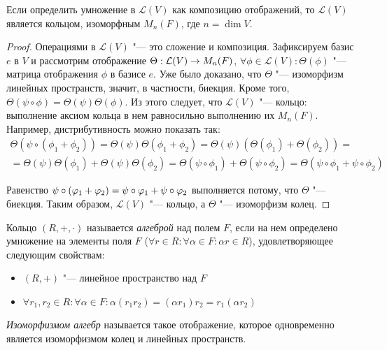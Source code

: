 \begin{corollary}
	Если определить умножение в $\mathcal{L}(V)$ как композицию отображений, то $\mathcal{L}(V)$ является кольцом, изоморфным $M_n(F)$, где $n = \dim{V}$.
\end{corollary}

\begin{proof}
	Операциями в $\mathcal{L}(V)$ "--- это сложение и композиция. Зафиксируем базис $e$ в $V$ и рассмотрим отображение $\Theta: \mathcal{L}(V) \hm{\rightarrow} M_n(F)$, $\forall \phi \in \mathcal{L}(V): \Theta(\phi)$ "--- матрица отображения $\phi$ в базисе $e$. Уже было доказано, что $\Theta$ "--- изоморфизм линейных пространств, значит, в частности, биекция. Кроме того, $\Theta(\psi \circ \phi) = \Theta(\psi)\Theta(\phi)$. Из этого следует, что $\mathcal{L}(V)$ "--- кольцо: выполнение аксиом кольца в нем равносильно выполнению их $M_n(F)$. Например, дистрибутивность можно показать так:
	\begin{multline*}
	\Theta(\psi \circ (\phi_1 + \phi_2)) = \Theta(\psi)\Theta(\phi_1 + \phi_2) = \Theta(\psi)(\Theta(\phi_1) + \Theta(\phi_2)) =\\ = \Theta(\psi)\Theta(\phi_1) + \Theta(\psi)\Theta(\phi_2) = \Theta(\psi \circ \phi_1) + \Theta(\psi \circ \phi_2) = \Theta(\psi \circ \phi_1 + \psi \circ \phi_2)
	\end{multline*}
	
	Равенство $\psi \circ (\phi_1 + \phi_2) \hm{=} \psi \circ \phi_1 + \psi \circ \phi_2$ выполняется потому, что $\Theta$ "--- биекция. Таким образом, $\mathcal{L}(V)$ "--- кольцо, а $\Theta$ "--- изоморфизм колец.
\end{proof}

\begin{definition}
	Кольцо $(R, +, \cdot)$ называется \textit{алгеброй} над полем $F$, если на нем определено умножение на элементы поля $F$ ($\forall r \in R: \forall \alpha \in F: \alpha r \in R$), удовлетворяющее следующим свойствам:
	\begin{itemize}
		\item $(R, +)$ "--- линейное пространство над $F$
		\item $\forall r_1, r_2 \in R: \forall \alpha \in F: \alpha (r_1r_2) = (\alpha r_1)r_2 = r_1 (\alpha r_2)$
	\end{itemize}
\end{definition}

\begin{definition}
	\textit{Изоморфизмом алгебр} называется такое отображение, которое одновременно является изоморфизмом колец и линейных пространств.
\end{definition}

